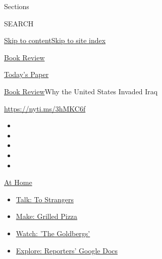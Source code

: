 Sections

SEARCH

\protect\hyperlink{site-content}{Skip to
content}\protect\hyperlink{site-index}{Skip to site index}

\href{https://www.nytimes3xbfgragh.onion/section/books/review}{Book
Review}

\href{https://myaccount.nytimes3xbfgragh.onion/auth/login?response_type=cookie\&client_id=vi}{}

\href{https://www.nytimes3xbfgragh.onion/section/todayspaper}{Today's
Paper}

\href{/section/books/review}{Book Review}\textbar{}Why the United States
Invaded Iraq

\url{https://nyti.ms/3hMKC6f}

\begin{itemize}
\item
\item
\item
\item
\item
\end{itemize}

\href{https://www.nytimes3xbfgragh.onion/spotlight/at-home?action=click\&pgtype=Article\&state=default\&region=TOP_BANNER\&context=at_home_menu}{At
Home}

\begin{itemize}
\tightlist
\item
  \href{https://www.nytimes3xbfgragh.onion/2020/08/03/well/family/the-benefits-of-talking-to-strangers.html?action=click\&pgtype=Article\&state=default\&region=TOP_BANNER\&context=at_home_menu}{Talk:
  To Strangers}
\item
  \href{https://www.nytimes3xbfgragh.onion/2020/08/01/at-home/coronavirus-make-pizza-on-a-grill.html?action=click\&pgtype=Article\&state=default\&region=TOP_BANNER\&context=at_home_menu}{Make:
  Grilled Pizza}
\item
  \href{https://www.nytimes3xbfgragh.onion/2020/07/31/arts/television/goldbergs-abc-stream.html?action=click\&pgtype=Article\&state=default\&region=TOP_BANNER\&context=at_home_menu}{Watch:
  'The Goldbergs'}
\item
  \href{https://www.nytimes3xbfgragh.onion/interactive/2020/at-home/even-more-reporters-editors-diaries-lists-recommendations.html?action=click\&pgtype=Article\&state=default\&region=TOP_BANNER\&context=at_home_menu}{Explore:
  Reporters' Google Docs}
\end{itemize}


